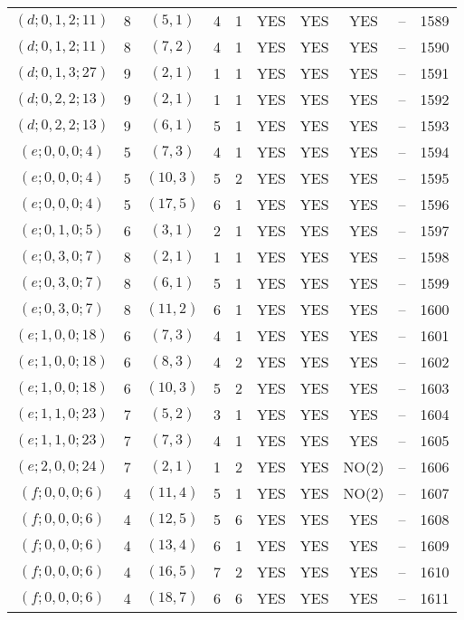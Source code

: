 \begin{longtable}{|c|c|c|c|c|c|c|c|c|c|}
$(d; 0, 1, 2; 11)$ & 8 & $(5, 1)$ & 4 & 1 & YES & YES & YES & -- & 1589\\
$(d; 0, 1, 2; 11)$ & 8 & $(7, 2)$ & 4 & 1 & YES & YES & YES & -- & 1590\\
$(d; 0, 1, 3; 27)$ & 9 & $(2, 1)$ & 1 & 1 & YES & YES & YES & -- & 1591\\
$(d; 0, 2, 2; 13)$ & 9 & $(2, 1)$ & 1 & 1 & YES & YES & YES & -- & 1592\\
$(d; 0, 2, 2; 13)$ & 9 & $(6, 1)$ & 5 & 1 & YES & YES & YES & -- & 1593\\
$(e; 0, 0, 0; 4)$ & 5 & $(7, 3)$ & 4 & 1 & YES & YES & YES & -- & 1594\\
$(e; 0, 0, 0; 4)$ & 5 & $(10, 3)$ & 5 & 2 & YES & YES & YES & -- & 1595\\
$(e; 0, 0, 0; 4)$ & 5 & $(17, 5)$ & 6 & 1 & YES & YES & YES & -- & 1596\\
$(e; 0, 1, 0; 5)$ & 6 & $(3, 1)$ & 2 & 1 & YES & YES & YES & -- & 1597\\
$(e; 0, 3, 0; 7)$ & 8 & $(2, 1)$ & 1 & 1 & YES & YES & YES & -- & 1598\\
$(e; 0, 3, 0; 7)$ & 8 & $(6, 1)$ & 5 & 1 & YES & YES & YES & -- & 1599\\
$(e; 0, 3, 0; 7)$ & 8 & $(11, 2)$ & 6 & 1 & YES & YES & YES & -- & 1600\\
$(e; 1, 0, 0; 18)$ & 6 & $(7, 3)$ & 4 & 1 & YES & YES & YES & -- & 1601\\
$(e; 1, 0, 0; 18)$ & 6 & $(8, 3)$ & 4 & 2 & YES & YES & YES & -- & 1602\\
$(e; 1, 0, 0; 18)$ & 6 & $(10, 3)$ & 5 & 2 & YES & YES & YES & -- & 1603\\
$(e; 1, 1, 0; 23)$ & 7 & $(5, 2)$ & 3 & 1 & YES & YES & YES & -- & 1604\\
$(e; 1, 1, 0; 23)$ & 7 & $(7, 3)$ & 4 & 1 & YES & YES & YES & -- & 1605\\
$(e; 2, 0, 0; 24)$ & 7 & $(2, 1)$ & 1 & 2 & YES & YES & NO(2) & -- & 1606\\
$(f; 0, 0, 0; 6)$ & 4 & $(11, 4)$ & 5 & 1 & YES & YES & NO(2) & -- & 1607\\
$(f; 0, 0, 0; 6)$ & 4 & $(12, 5)$ & 5 & 6 & YES & YES & YES & -- & 1608\\
$(f; 0, 0, 0; 6)$ & 4 & $(13, 4)$ & 6 & 1 & YES & YES & YES & -- & 1609\\
$(f; 0, 0, 0; 6)$ & 4 & $(16, 5)$ & 7 & 2 & YES & YES & YES & -- & 1610\\
$(f; 0, 0, 0; 6)$ & 4 & $(18, 7)$ & 6 & 6 & YES & YES & YES & -- & 1611\\

\end{longtable}
